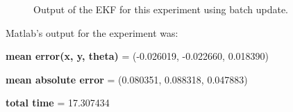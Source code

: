\begin{figure}[H]
	\scalebox{0.6}{}
	\scalebox{0.6}{}

	\centering
	\centerline{}

	\caption{Output of the EKF for this experiment using batch update.}
	\label{fig:iii33_b}
\end{figure}

Matlab's output for the experiment was:

\textbf{mean error(x, y, theta)} = (-0.026019, -0.022660, 0.018390)

\textbf{mean absolute error} = (0.080351, 0.088318, 0.047883)

\textbf{total time} = 17.307434

